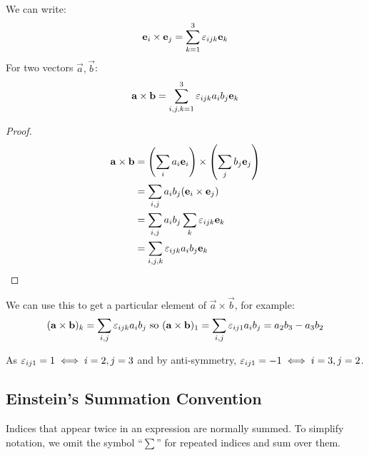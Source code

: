 \documentclass[../main.tex]{subfiles}
\begin{document}
We can write:
\[
  \boldsymbol{\mathbf{e}}_i \times \boldsymbol{\mathbf{e}}_j = \sum_{k=1}^{3} \varepsilon_{ijk} \boldsymbol{\mathbf{e}}_k
\]
For two vectors $\vec{a}, \vec{b}$:
\[
  \boldsymbol{\mathbf{a}} \times \boldsymbol{\mathbf{b}} = \sum_{i,j,k = 1}^{3} \varepsilon_{ijk} a_i b_j \boldsymbol{\mathbf{e}}_k
\]
\begin{proof}
  \begin{align*}
    \boldsymbol{\mathbf{a}} \times \boldsymbol{\mathbf{b}} &= \left(\sum_i a_i \boldsymbol{\mathbf{e}}_i\right) \times \left(\sum_j b_j \boldsymbol{\mathbf{e}}_j\right) \\
                           &= \sum_{i,j} a_i b_j (\boldsymbol{\mathbf{e}}_i \times \boldsymbol{\mathbf{e}}_j) \\
                           &= \sum_{i,j} a_i b_j \sum_k \varepsilon_{i j k} \boldsymbol{\mathbf{e}}_k \\
                           &= \sum_{i,j,k} \varepsilon_{i j k} a_i b_j \boldsymbol{\mathbf{e}}_k
  \end{align*}
\end{proof}
We can use this to get a particular element of $\vec{a} \times \vec{b}$, for example:
\begin{equation}
  \label{crossComponent}
  (\boldsymbol{\mathbf{a}} \times \boldsymbol{\mathbf{b}})_k = \sum_{i, j} \varepsilon_{i j k} a_i b_j \text{ so }
  (\boldsymbol{\mathbf{a}} \times \boldsymbol{\mathbf{b}})_1 = \sum_{i, j} \varepsilon_{i j 1} a_i b_j = a_2 b_3 - a_3 b_2
\end{equation}

As $\varepsilon_{i j 1} = 1 \iff i = 2, j = 3$ and by anti-symmetry, $\varepsilon_{i j 1} = -1 \iff i = 3, j = 2$.
\subsection{Einstein's Summation Convention}
Indices that appear twice in an expression are normally summed.
To simplify notation, we omit the symbol ``$\sum$'' for repeated indices and sum over them.
\end{document}
